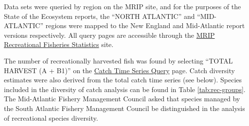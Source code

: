 \documentclass[
]{book}
\begin{document}
Data sets were queried by region on the MRIP site, and for the purposes of the State of the Ecosystem reports, the ``NORTH ATLANTIC'' and ``MID-ATLANTIC'' regions were mapped to the New England and Mid-Atlantic report versions respectively. All query pages are accessible through the \href{https://www.st.nmfs.noaa.gov/recreational-fisheries/data-and-documentation/queries/index}{MRIP Recreational Fisheries Statistics} site.

The number of recreationally harvested fish was found by selecting ``TOTAL HARVEST (A + B1)'' on the \href{https://www.st.nmfs.noaa.gov/recreational-fisheries/data-and-documentation/run-a-data-query}{Catch Time Series Query} page. Catch diversity estimates were also derived from the total catch time series (see below). Species included in the diversity of catch analysis can be found in Table \ref{tab:rec-groups}. The Mid-Atlantic Fishery Management Council asked that species managed by the South Atlantic Fishery Management Council be distinguished in the analysis of recreational species diversity.
\end{document}
